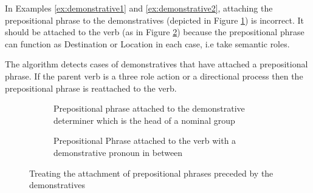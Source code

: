     In Examples \ref{ex:demonstrative1} and \ref{ex:demonstrative2}, attaching the prepositional phrase to the demonstratives (depicted in Figure \ref{fig:demonstrative-init}) is incorrect. It should be attached to the verb (as in Figure \ref{fig:demonstrative-final}) because the prepositional phrase can function as Destination or Location in each case, i.e take semantic roles. 

    The algorithm detects cases of demonstratives that have attached a prepositional phrase. If the parent verb is a three role action or a directional process then the prepositional phrase is reattached to the verb.

    \begin{figure}[!ht]
        \centering
        \begin{subfigure}[t]{0.45\linewidth}
        \centering
        \caption{Prepositional phrase attached to the demonstrative determiner which is the head of a nominal group}
        \label{fig:demonstrative-init}
        \end{subfigure}
        \quad
        \begin{subfigure}[t]{0.45\linewidth}
        \centering
        	\caption{Prepositional Phrase attached to the verb with a demonstrative pronoun in between}
        	\label{fig:demonstrative-final}
        \end{subfigure}
        \caption{Treating the attachment of prepositional phrases preceded by the demonstratives}
        \label{fig:demonstrative-final-final}
    \end{figure}

